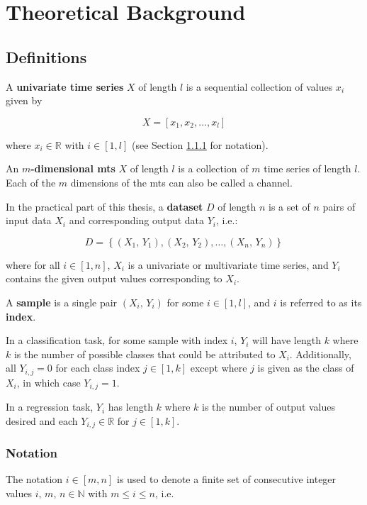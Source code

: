 \section{Theoretical Background}

\subsection{Definitions}
A \textbf{univariate time series} \(X\) of length \(l\) is a sequential collection of values \(x_{i}\) given by

\[
    X = \left[x_{1}, x_{2}, \ldots, x_{l}\right]
\]

where \(x_{i} \in \mathbb{R}\) with \(i \in \left[1, l\right]\) (see Section \ref{sec:notation} for notation).

An \textbf{\(m\)-dimensional \ac{mts}} \(X\) of length \(l\) is a collection of \(m\) time series of length \(l\). Each of the \(m\) dimensions of the \ac{mts} can also be called a channel.
\cite[]{ismail_fawaz_deep_2019}

In the practical part of this thesis, a \textbf{dataset} \(D\) of length \(n\) is a set of \(n\) pairs of input data \(X_i\) and corresponding output data \(Y_i\), i.e.:

\[
    D = \left\{\left(X_1,\,Y_1\right), \left(X_2,\,Y_2\right), \ldots, \left(X_n,\,Y_n\right)\right\}
\]

where for all \(i \in \left[1, n\right]\), \(X_i\) is a univariate or multivariate time series, and \(Y_i\) contains the given output values corresponding to \(X_i\).

A \textbf{sample} is a single pair \(\left(X_i,\,Y_i\right)\) for some \(i \in \left[1, l\right]\), and \(i\) is referred to as its \textbf{index}.

In a classification task, for some sample with index \(i\), \(Y_i\) will have length \(k\) where \(k\) is the number of possible classes that could be attributed to \(X_i\). Additionally, all \(Y_{i,j} = 0\) for each class index \(j \in \left[1, k\right]\) except where \(j\) is given as the class of \(X_i\), in which case \(Y_{i,j} = 1\).

In a regression task, \(Y_i\) has length \(k\) where \(k\) is the number of output values desired and each \(Y_{i,j} \in \mathbb{R}\) for \(j \in \left[1, k\right]\).

\subsubsection{Notation} \label{sec:notation}
The notation \(i \in \left[m, n\right]\) is used to denote a finite set of consecutive integer values \(i,\,m,\,n \in \mathbb{N}\) with \(m \leq i \leq n\), i.e.

